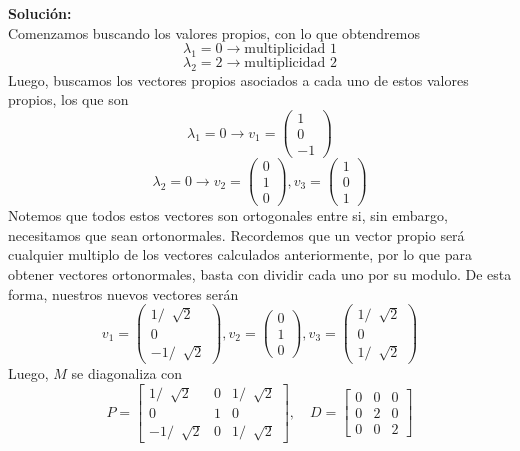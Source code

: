 \documentclass[12pt]{article}
\newenvironment{solucion}
{\begin{mdframed}[backgroundcolor=black!10]
		{\bf Solución:}\\
	}
	{
	\end{mdframed}
}
\newenvironment{preguntas}
{\begin{enumerate}\itemsep12pt
	}
	{
	\end{enumerate}
}
\newcommand{\ra}{\rightarrow}
\begin{document}
\begin{preguntas}
\begin{solucion}
		Comenzamos buscando los valores propios, con lo que obtendremos
		$$\lambda_1 = 0 \ra \text{multiplicidad 1}$$
		$$\lambda_2 = 2 \ra \text{multiplicidad 2}$$
		Luego, buscamos los vectores propios asociados a cada uno de estos valores propios, los que son
		$$\lambda_1 = 0 \ra v_1 = \begin{pmatrix}
		1 \\ 0 \\ -1
		\end{pmatrix}$$
		$$\lambda_2 = 0 \ra v_2 = \begin{pmatrix}
		0 \\ 1 \\ 0
		\end{pmatrix}, v_3 = \begin{pmatrix}
		1 \\ 0 \\ 1
		\end{pmatrix}$$
		Notemos que todos estos vectores son ortogonales entre si, sin embargo, necesitamos que sean ortonormales. Recordemos que un vector propio será cualquier multiplo de los vectores calculados anteriormente, por lo que para obtener vectores ortonormales, basta con dividir cada uno por su modulo. De esta forma, nuestros nuevos vectores serán
		$$v_1 = \begin{pmatrix}
		1/\ \sqrt[]{2} \\ 0 \\ -1/\ \sqrt[]{2}
		\end{pmatrix}, v_2 = \begin{pmatrix}
		0 \\ 1 \\ 0
		\end{pmatrix}, v_3 = \begin{pmatrix}
		1/\ \sqrt[]{2} \\ 0 \\ 1/\ \sqrt[]{2}
		\end{pmatrix}$$
		Luego, $M$ se diagonaliza con
		$$P = \begin{bmatrix}
		1/\ \sqrt[]{2} & 0 & 1/\ \sqrt[]{2} \\
		0 & 1 & 0 \\
		-1/\ \sqrt[]{2} & 0 & 1/\ \sqrt[]{2}
		\end{bmatrix}, \quad D = \begin{bmatrix}
		0 & 0 & 0 \\
		0 & 2 & 0 \\
		0 & 0 & 2
		\end{bmatrix}$$
\end{solucion}
\end{preguntas}
\end{document}
